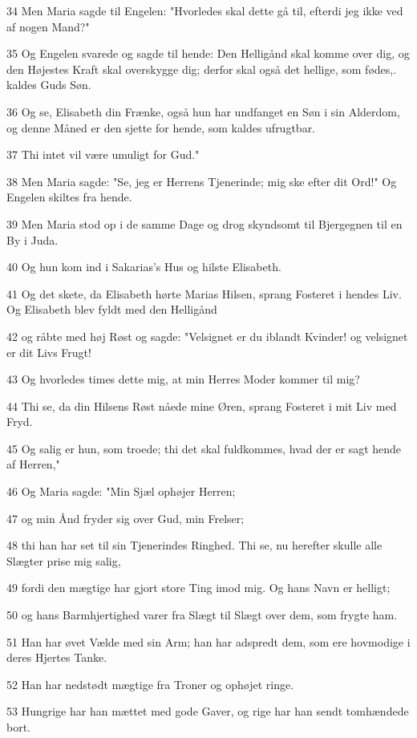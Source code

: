 \par 34 Men Maria sagde til Engelen: "Hvorledes skal dette gå til, efterdi jeg ikke ved af nogen Mand?"
\par 35 Og Engelen svarede og sagde til hende: Den Helligånd skal komme over dig, og den Højestes Kraft skal overskygge dig; derfor skal også det hellige, som fødes,. kaldes Guds Søn.
\par 36 Og se, Elisabeth din Frænke, også hun har undfanget en Søn i sin Alderdom, og denne Måned er den sjette for hende, som kaldes ufrugtbar.
\par 37 Thi intet vil være umuligt for Gud."
\par 38 Men Maria sagde: "Se, jeg er Herrens Tjenerinde; mig ske efter dit Ord!" Og Engelen skiltes fra hende.
\par 39 Men Maria stod op i de samme Dage og drog skyndsomt til Bjergegnen til en By i Juda.
\par 40 Og hun kom ind i Sakarias's Hus og hilste Elisabeth.
\par 41 Og det skete, da Elisabeth hørte Marias Hilsen, sprang Fosteret i hendes Liv. Og Elisabeth blev fyldt med den Helligånd
\par 42 og råbte med høj Røst og sagde: "Velsignet er du iblandt Kvinder! og velsignet er dit Livs Frugt!
\par 43 Og hvorledes times dette mig, at min Herres Moder kommer til mig?
\par 44 Thi se, da din Hilsens Røst nåede mine Øren, sprang Fosteret i mit Liv med Fryd.
\par 45 Og salig er hun, som troede; thi det skal fuldkommes, hvad der er sagt hende af Herren,"
\par 46 Og Maria sagde: "Min Sjæl ophøjer Herren;
\par 47 og min Ånd fryder sig over Gud, min Frelser;
\par 48 thi han har set til sin Tjenerindes Ringhed. Thi se, nu herefter skulle alle Slægter prise mig salig,
\par 49 fordi den mægtige har gjort store Ting imod mig. Og hans Navn er helligt;
\par 50 og hans Barmhjertighed varer fra Slægt til Slægt over dem, som frygte ham.
\par 51 Han har øvet Vælde med sin Arm; han har adspredt dem, som ere hovmodige i deres Hjertes Tanke.
\par 52 Han har nedstødt mægtige fra Troner og ophøjet ringe.
\par 53 Hungrige har han mættet med gode Gaver, og rige har han sendt tomhændede bort.
